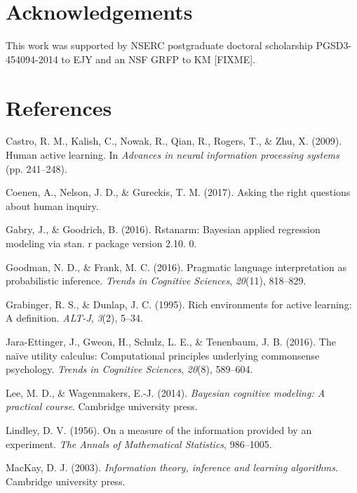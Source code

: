 \documentclass[10pt, letterpaper]{article}
\begin{document}
\section{Acknowledgements}\label{acknowledgements}

This work was supported by NSERC postgraduate doctoral scholarship
PGSD3-454094-2014 to EJY and an NSF GRFP to KM {[}FIXME{]}.

\section{References}\label{references}

\setlength{\parindent}{-0.1in} \setlength{\leftskip}{0.125in} \noindent

\hypertarget{refs}{}
\hypertarget{ref-castro2009human}{}
Castro, R. M., Kalish, C., Nowak, R., Qian, R., Rogers, T., \& Zhu, X.
(2009). Human active learning. In \emph{Advances in neural information
processing systems} (pp. 241--248).

\hypertarget{ref-coenen2017}{}
Coenen, A., Nelson, J. D., \& Gureckis, T. M. (2017). Asking the right
questions about human inquiry.

\hypertarget{ref-gabry2016rstanarm}{}
Gabry, J., \& Goodrich, B. (2016). Rstanarm: Bayesian applied regression
modeling via stan. r package version 2.10. 0.

\hypertarget{ref-goodman2016}{}
Goodman, N. D., \& Frank, M. C. (2016). Pragmatic language
interpretation as probabilistic inference. \emph{Trends in Cognitive
Sciences}, \emph{20}(11), 818--829.

\hypertarget{ref-grabinger1995rich}{}
Grabinger, R. S., \& Dunlap, J. C. (1995). Rich environments for active
learning: A definition. \emph{ALT-J}, \emph{3}(2), 5--34.

\hypertarget{ref-jara2016}{}
Jara-Ettinger, J., Gweon, H., Schulz, L. E., \& Tenenbaum, J. B. (2016).
The naïve utility calculus: Computational principles underlying
commonsense psychology. \emph{Trends in Cognitive Sciences},
\emph{20}(8), 589--604.

\hypertarget{ref-lee2014bayesian}{}
Lee, M. D., \& Wagenmakers, E.-J. (2014). \emph{Bayesian cognitive
modeling: A practical course}. Cambridge university press.

\hypertarget{ref-lindley1956}{}
Lindley, D. V. (1956). On a measure of the information provided by an
experiment. \emph{The Annals of Mathematical Statistics}, 986--1005.

\hypertarget{ref-mackay2003}{}
MacKay, D. J. (2003). \emph{Information theory, inference and learning
algorithms}. Cambridge university press.
\end{document}

